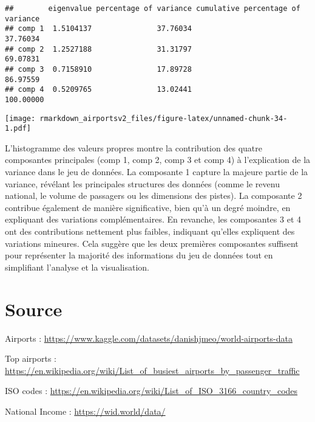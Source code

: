 \documentclass[
]{compterendu}
\begin{document}
\begin{verbatim}
##        eigenvalue percentage of variance cumulative percentage of variance
## comp 1  1.5104137               37.76034                          37.76034
## comp 2  1.2527188               31.31797                          69.07831
## comp 3  0.7158910               17.89728                          86.97559
## comp 4  0.5209765               13.02441                         100.00000
\end{verbatim}

\texttt{[image: rmarkdown\_airportsv2\_files/figure-latex/unnamed-chunk-34-1.pdf]}

L'histogramme des valeurs propres montre la contribution des quatre
composantes principales (comp 1, comp 2, comp 3 et comp 4) à
l'explication de la variance dans le jeu de données. La composante 1
capture la majeure partie de la variance, révélant les principales
structures des données (comme le revenu national, le volume de passagers
ou les dimensions des pistes). La composante 2 contribue également de
manière significative, bien qu'à un degré moindre, en expliquant des
variations complémentaires. En revanche, les composantes 3 et 4 ont des
contributions nettement plus faibles, indiquant qu'elles expliquent des
variations mineures. Cela suggère que les deux premières composantes
suffisent pour représenter la majorité des informations du jeu de
données tout en simplifiant l'analyse et la visualisation.

\section{\texorpdfstring{\textbf{Source}}{Source}}\label{source}

Airports :
\url{https://www.kaggle.com/datasets/danishjmeo/world-airports-data}

Top airports :
\url{https://en.wikipedia.org/wiki/List_of_busiest_airports_by_passenger_traffic}

ISO codes :
\url{https://en.wikipedia.org/wiki/List_of_ISO_3166_country_codes}

National Income : \url{https://wid.world/data/}
\end{document}
